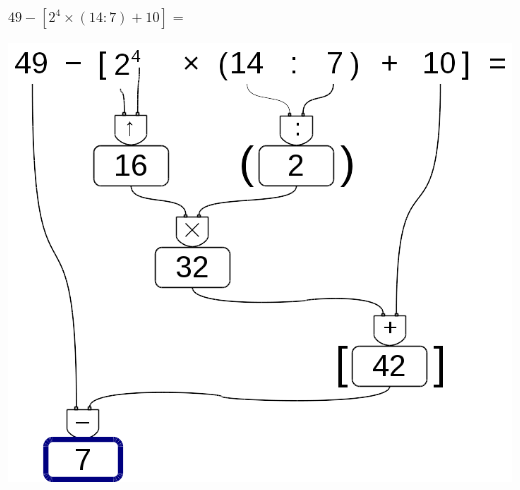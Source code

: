 
 \begin{esempio}
  \(49 - [2^4 \times (14 : 7) + 10]=\)
  
\begin{inaccessibleblock}
 \begin{center}
  \includegraphics[scale=0.35]{img/op_espr.png}
 \end{center}
\end{inaccessibleblock}
 \end{esempio}

